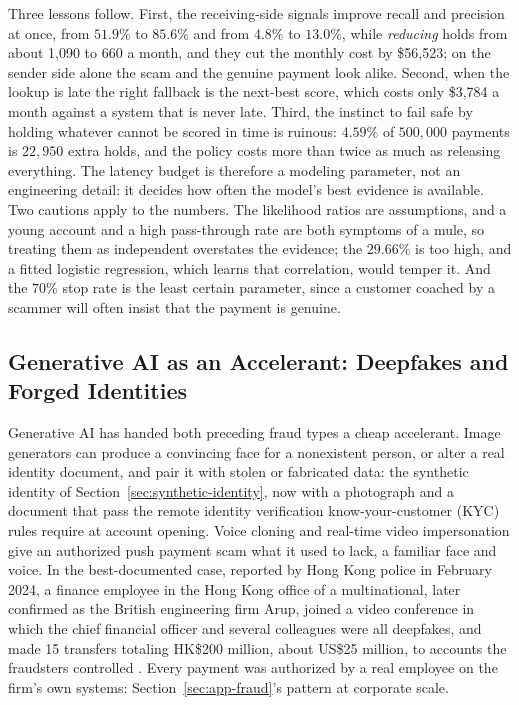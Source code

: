 \documentclass[../ai_in_finance]{subfiles}
\begin{document}
Three lessons follow. First, the receiving-side signals improve recall and precision at once, from $51.9\%$ to $85.6\%$ and from $4.8\%$ to $13.0\%$, while \emph{reducing} holds from about 1,090 to 660 a month, and they cut the monthly cost by \$56,523; on the sender side alone the scam and the genuine payment look alike. Second, when the lookup is late the right fallback is the next-best score, which costs only \$3,784 a month against a system that is never late. Third, the instinct to fail safe by holding whatever cannot be scored in time is ruinous: $4.59\%$ of $500{,}000$ payments is $22{,}950$ extra holds, and the policy costs more than twice as much as releasing everything. The latency budget is therefore a modeling parameter, not an engineering detail: it decides how often the model's best evidence is available. Two cautions apply to the numbers. The likelihood ratios are assumptions, and a young account and a high pass-through rate are both symptoms of a mule, so treating them as independent overstates the evidence; the $29.66\%$ is too high, and a fitted logistic regression, which learns that correlation, would temper it. And the $70\%$ stop rate is the least certain parameter, since a customer coached by a scammer will often insist that the payment is genuine.

\subsection{Generative AI as an Accelerant: Deepfakes and Forged Identities}
\label{sec:genai-fraud}

Generative AI has handed both preceding fraud types a cheap accelerant. Image generators can produce a convincing face for a nonexistent person, or alter a real identity document, and pair it with stolen or fabricated data: the synthetic identity of Section~\ref{sec:synthetic-identity}, now with a photograph and a document that pass the remote identity verification know-your-customer (KYC) rules require at account opening. Voice cloning and real-time video impersonation give an authorized push payment scam what it used to lack, a familiar face and voice. In the best-documented case, reported by Hong Kong police in February 2024, a finance employee in the Hong Kong office of a multinational, later confirmed as the British engineering firm Arup, joined a video conference in which the chief financial officer and several colleagues were all deepfakes, and made 15 transfers totaling HK\$200 million, about US\$25 million, to accounts the fraudsters controlled \parencite{chen2024deepfake,magramo2024arup}. Every payment was authorized by a real employee on the firm's own systems: Section~\ref{sec:app-fraud}'s pattern at corporate scale.
\end{document}
